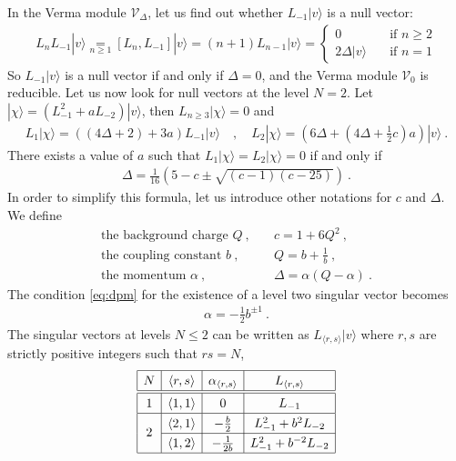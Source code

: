 \documentclass[12pt, a4paper]{article}
\theoremstyle{break}
\begin{document}
In the Verma module $\mathcal V_\Delta$, let us find out whether $L_{-1}|v\rangle$ is a null vector:
\begin{align}
L_n L_{-1}|v\rangle \underset{n\geq 1}{=} [L_n, L_{-1}] |v\rangle = (n+1) L_{n-1}|v\rangle = 
\left\{\begin{array}{ll} 0 &  \quad \text{if } n\geq 2 \\ 2\Delta |v\rangle & \quad \text{if } n = 1 \end{array}\right. 
\end{align}
So $L_{-1}|v\rangle$ is a null vector if and only if $\Delta=0$, and the Verma module $\mathcal V_0$ is reducible.
Let us now look for null vectors at the level $N=2$. Let $|\chi\rangle = (L_{-1}^2 + a L_{-2})|v\rangle$, then $L_{n\geq 3} |\chi \rangle =0$ and 
 \begin{align}
  L_1 |\chi\rangle = \left((4\Delta+2) + 3a\right) L_{-1}|v\rangle
  \quad , \quad L_2 |\chi\rangle= \left(6\Delta + (4\Delta +\tfrac12 c)a\right) |v\rangle\ .
 \end{align}
 There exists a value of $a$ such that $L_1|\chi\rangle = L_2|\chi\rangle =0$ if and only if 
 \begin{align}
 \Delta = \frac{1}{16}\left( 5-c\pm\sqrt{(c-1)(c-25)} \right) \ .
 \label{eq:dpm}
\end{align}
In order to simplify this formula, let us introduce other notations for $c$ and $\Delta$. We define
\begin{align}
 \text{the background charge } Q \ , & \quad c = 1+6Q^2\ , 
 \\
 \text{the coupling constant } b \ , & \quad Q = b+\frac{1}{b} \ ,
 \\
 \text{the momentum } \alpha\  , &\quad \Delta = \alpha(Q-\alpha)\ .
\end{align}
The condition \eqref{eq:dpm} for the existence of a level two singular vector becomes 
\begin{align}
 \alpha = -\frac12 b^{\pm 1}\ .
\end{align}
The singular vectors at levels $N\leq 2$ can be written as $L_{\langle r,s\rangle}|v\rangle$ where $r,s$ are strictly positive integers such that $rs=N$,
\begin{align}
\renewcommand{\arraystretch}{1.3}
\begin{array}{|c|c|c|c|}
\hline 
N & \langle r,s\rangle  & \alpha_{\langle r,s\rangle} & L_{\langle r,s\rangle} 
\\
\hline\hline
1 & \langle 1,1\rangle &  0 & L_{-1}
\\
\hline
\multirow{2}{*}{2} & 
\langle 2,1\rangle &  -\frac{b}{2} & L_{-1}^2 + b^2 L_{-2}
\\
\cline{2-4}
& \langle 1,2\rangle &   -\frac{1}{2b} & L_{-1}^2 + b^{-2} L_{-2} 
\\
\hline
\end{array}
\label{lot}
\end{align}
\end{document}
